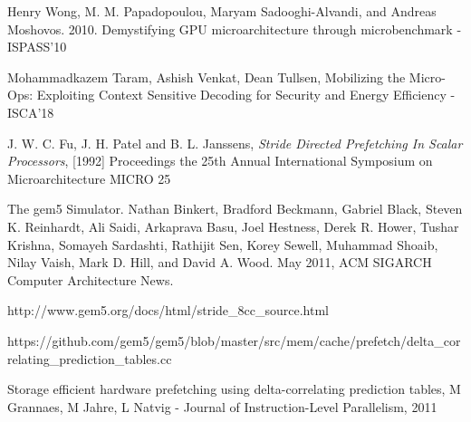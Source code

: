 \documentclass[10pt,usenames,dvipsnames]{beamer}
\begin{document}
\begin{frame}[allowframebreaks]
\begin{thebibliography}{10}
Henry Wong, M. M. Papadopoulou, Maryam Sadooghi-Alvandi, and Andreas Moshovos. 2010. Demystifying GPU microarchitecture through microbenchmark - ISPASS'10

Mohammadkazem Taram, Ashish Venkat, Dean Tullsen, Mobilizing the Micro-Ops: Exploiting Context Sensitive Decoding for Security and Energy Efficiency - ISCA'18

J. W. C. Fu, J. H. Patel and B. L. Janssens, {\it Stride Directed Prefetching In Scalar Processors}, [1992] Proceedings the 25th Annual International Symposium on Microarchitecture MICRO 25

The gem5 Simulator. Nathan Binkert, Bradford Beckmann, Gabriel Black, Steven K. Reinhardt, Ali Saidi, Arkaprava Basu, Joel Hestness, Derek R. Hower, Tushar Krishna, Somayeh Sardashti, Rathijit Sen, Korey Sewell, Muhammad Shoaib, Nilay Vaish, Mark D. Hill, and David A. Wood. May 2011, ACM SIGARCH Computer Architecture News.

http://www.gem5.org/docs/html/stride\_8cc\_source.html

https://github.com/gem5/gem5/blob/master/src/mem/cache/prefetch/delta\_correlating\_prediction\_tables.cc

Storage efficient hardware prefetching using delta-correlating prediction tables, M Grannaes, M Jahre, L Natvig - Journal of Instruction-Level Parallelism, 2011
\end{thebibliography}
\end{frame}

\end{document}
